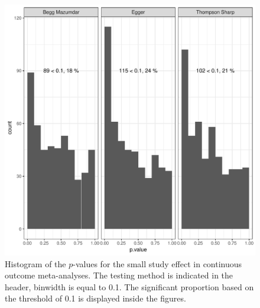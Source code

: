 \documentclass[11pt,a4paper,twoside]{book}\usepackage[]{graphicx}\usepackage[]{color}
\makeatletter
\def\maxwidth{ %
  \ifdim\Gin@nat@width>\linewidth
    \linewidth
  \else
    \Gin@nat@width
  \fi
}
\newenvironment{knitrout}{}{} %
\makeatother
\begin{document}
\begin{figure}
\begin{knitrout}
\color{fgcolor}
\includegraphics[width=\maxwidth]{figure/unnamed-chunk-14-1} 

\end{knitrout}
\caption{Histogram of the $p$-values for the small study effect in continuous outcome meta-analyses. The testing method is indicated in the header, binwidth is equal to 0.1. The significant proportion based on the threshold of 0.1 is displayed inside the figures.}
\label{fig:test.cont}
\end{figure}
\end{document}
